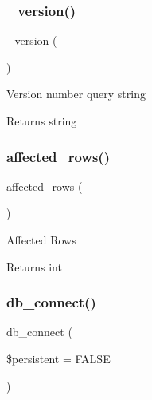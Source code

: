 \subsubsection{\texorpdfstring{\+\_\+version()}{\_version()}}
{\footnotesize\ttfamily \+\_\+version (\begin{DoxyParamCaption}{ }\end{DoxyParamCaption})\hspace{0.3cm}{\ttfamily [protected]}}

Version number query string

\begin{DoxyReturn}{Returns}
string 
\end{DoxyReturn}
\mbox{\label{class_c_i___d_b__mssql__driver_a77248aaad33eb132c04cc4aa3f4bc8cb}} 
\subsubsection{\texorpdfstring{affected\+\_\+rows()}{affected\_rows()}}
{\footnotesize\ttfamily affected\+\_\+rows (\begin{DoxyParamCaption}{ }\end{DoxyParamCaption})}

Affected Rows

\begin{DoxyReturn}{Returns}
int 
\end{DoxyReturn}
\mbox{\label{class_c_i___d_b__mssql__driver_a52bf595e79e96cc0a7c907a9b45aeb4d}} 
\subsubsection{\texorpdfstring{db\+\_\+connect()}{db\_connect()}}
{\footnotesize\ttfamily db\+\_\+connect (\begin{DoxyParamCaption}\item[{}]{\$persistent = {\ttfamily FALSE} }\end{DoxyParamCaption})}

